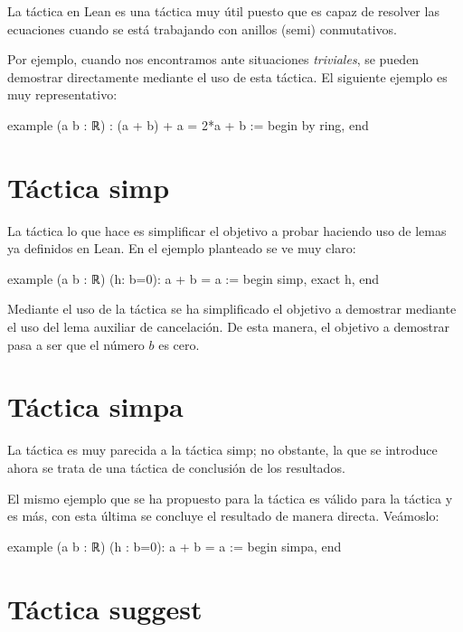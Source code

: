 La táctica  en Lean es una táctica muy útil puesto que es
capaz de resolver las ecuaciones cuando se está trabajando con anillos
(semi) conmutativos.

Por ejemplo, cuando nos encontramos ante situaciones \textit{triviales}, se
pueden demostrar directamente mediante el uso de esta táctica. El siguiente
ejemplo es muy representativo:

\begin{leancode}
example (a b : ℝ) : (a + b) + a = 2*a + b :=
begin
  by ring,
end
\end{leancode}

\section{Táctica simp}

La táctica  lo que hace es simplificar el objetivo a probar
haciendo uso de lemas ya definidos en Lean. En el ejemplo planteado se ve muy
claro:
\begin{leancode}
example (a b : ℝ) (h: b=0): a + b = a :=
begin
  simp,
  exact h,
end
\end{leancode}

Mediante el uso de la táctica  se ha simplificado el
objetivo a demostrar mediante el uso del lema auxiliar de cancelación. De esta
manera, el objetivo a demostrar pasa a ser que el número \(b\) es cero.

\section{Táctica simpa}

La táctica  es muy parecida a la táctica 
{simp}; no obstante, la que se introduce ahora se trata de una táctica de
conclusión de los resultados.

El mismo ejemplo que se ha propuesto para la táctica  es
válido para la táctica  y es más, con esta última se
concluye el resultado de manera directa. Veámoslo:

\begin{leancode}
example (a b : ℝ) (h : b=0): a + b = a :=
begin
  simpa,
end
\end{leancode}

\section{Táctica suggest}

